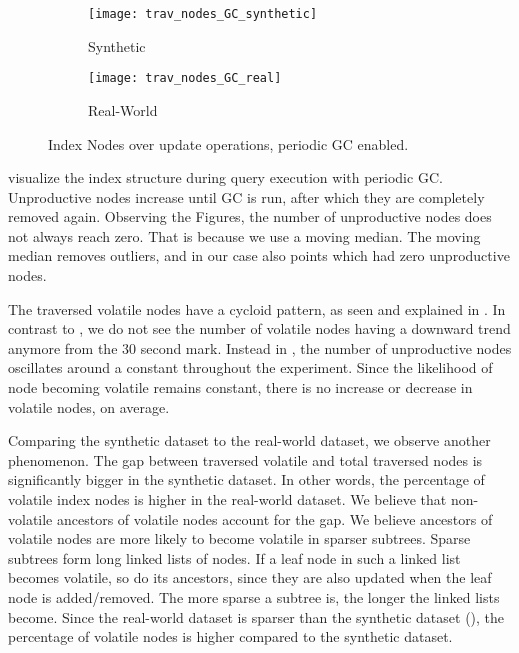 \documentclass[abstracton,12pt]{scrartcl}
\theoremstyle{definition}
\begin{document}
\begin{figure}[ht]
  \centering
  \begin{subfigure}{0.49\linewidth}
    \centering
    \caption{Synthetic}
    \texttt{[image: trav\_nodes\_GC\_synthetic]}
    \label{fig:trav_nodes_GC_synthetic}
  \end{subfigure}
  \begin{subfigure}{0.49\linewidth}
    \centering
    \caption{Real-World}
    \texttt{[image: trav\_nodes\_GC\_real]}
    \label{fig:trav_nodes_GC_real}
  \end{subfigure}
  \vspace{-0.5cm}
  \caption{Index Nodes over update operations, periodic GC enabled.}
\end{figure}

 visualize the index
structure during query execution with periodic GC. Unproductive
nodes increase until GC is run, after which they are completely removed again.
Observing the Figures, the number of unproductive nodes does not always reach zero.
That is because we use a moving median. The moving median removes outliers, and in
our case also points which had zero unproductive nodes.

The traversed volatile nodes have a cycloid pattern, as seen and explained in
.
In contrast to , 
we do not see the number of volatile nodes
having a downward trend anymore from the 30 second mark.
Instead in , 
the number of unproductive nodes oscillates around a constant throughout the experiment. 
Since the likelihood of node becoming volatile remains constant, there is no
increase or decrease in volatile nodes, on average.

Comparing the synthetic dataset to the real-world dataset, we observe another phenomenon.
The gap between traversed volatile and total traversed nodes is significantly bigger
in the synthetic dataset. In other words, the percentage of volatile index nodes
is higher in the real-world dataset. We believe that non-volatile
ancestors of volatile nodes account for the gap. 
We believe ancestors of volatile nodes are more likely to become volatile in
sparser subtrees. Sparse subtrees form long linked lists of nodes. If a leaf node
in such a linked list becomes volatile, so do its ancestors, since they are also
updated when the leaf node is added/removed. The more sparse a subtree is, the longer
the linked lists become.
Since the real-world dataset is sparser than the synthetic dataset (),
the percentage of volatile nodes is higher compared to the synthetic dataset.
\end{document}

